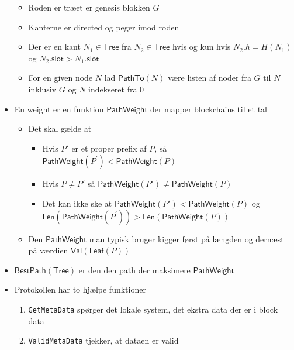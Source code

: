 \documentclass[a4, english]{article}
\begin{document}
\begin{itemize}
  \begin{itemize}
    \item Roden er træet er genesis blokken $G$ 
    \item Kanterne er directed og peger imod roden 
		\item Der er en kant $N_1 \in \mathsf{Tree}$ fra $N_2 \in \mathsf{Tree}$ hvis og kun hvis $N_2.h = H(N_1)$ og $N_2.\mathsf{slot} > N_1.\mathsf{slot}$
		\item For en given node $N$ lad $\mathsf{PathTo}(N)$ være listen af noder fra $G$ til $N$ inklusiv $G$ og $N$ indekseret fra 0
  \end{itemize}
	\item En weight er en funktion $\mathsf{PathWeight}$ der mapper blockchains til et tal 
  \begin{itemize}
    \item Det skal gælde at
    \begin{itemize}
  		\item Hvis $P'$ er et proper prefix af $P$, så $\mathsf{PathWeight}(P^{'}) < \mathsf{PathWeight}(P)$ 
  		\item Hvis $P \ne P'$ så $\mathsf{PathWeight}(P') \neq \mathsf{PathWeight}(P)$
  		\item Det kan ikke ske at $\mathsf{PathWeight}(P') < \mathsf{PathWeight}(P)$ og $\mathsf{Len}(\mathsf{PathWeight}(P^{'})) > \mathsf{Len}(\mathsf{PathWeight}(P))$ 
    \end{itemize}
    \item Den $\mathsf{PathWeight}$ man typisk bruger kigger først på længden og dernæst på værdien $\mathsf{Val}(\mathsf{Leaf}(P))$
  \end{itemize}
  \item $\mathsf{BestPath}(\mathsf{Tree})$ er den den path der maksimere $\mathsf{PathWeight}$
  \item Protokollen har to hjælpe funktioner
  \begin{enumerate}
	  \item \texttt{GetMetaData} spørger det lokale system, det ekstra data der er i block data
    \item \texttt{ValidMetaData} tjekker, at dataen er valid 
  \end{enumerate}
\end{itemize}
\end{document}
